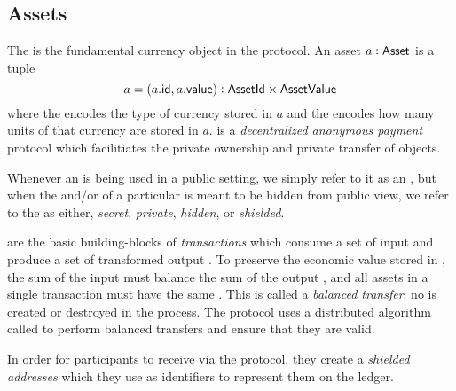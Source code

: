 \subsection{Assets}

The \Asset{} is the fundamental currency object in the \MantaPay{} protocol. An asset $a : {\textsf{Asset}}$ is a tuple
\[a = (a.{\textsf{id}}, a.{\textsf{value}}) : {\textsf{AssetId}} \times {\textsf{AssetValue}}\]
where the \AssetId{} encodes the type of currency stored in $a$ and the \AssetValue{} encodes how many units of that currency are stored in $a$.  \MantaPay{} is a \emph{decentralized anonymous payment} protocol which facilitiates the private ownership and private transfer of \Asset{} objects. 

Whenever an \Asset{} is being used in a public setting, we simply refer to it as an \Asset{}, but when the \AssetId{} and/or \AssetValue{} of a particular \Asset{} is meant to be hidden from public view, we refer to the \Asset{} as either, \emph{secret}, \emph{private}, \emph{hidden}, or \emph{shielded}.

 are the basic building-blocks of \emph{transactions} which consume a set of input  and produce a set of transformed output . To preserve the economic value stored in , the sum of the input  must balance the sum of the output , and all assets in a single transaction must have the same \AssetId{}\footnotemark{}. This is called a \emph{balanced transfer}: no \AssetValue{} is created or destroyed in the process. The \MantaPay{} protocol uses a distributed algorithm called \Transfer{} to perform balanced transfers and ensure that they are valid.


In order for \MantaPay{} participants to receive  via the \Transfer{} protocol, they create a \emph{shielded addresses} which they use as identifiers to represent them on the ledger.

\begin{center}
    \vspace{1em}
    \begin{mdframed}[leftmargin=0.2\textwidth, rightmargin=0.2\textwidth]
        \begin{center}
        \end{center}
    \end{mdframed}
    \vspace{-1em}
\end{center}


